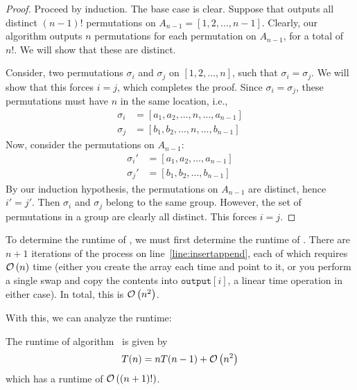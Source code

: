 \documentclass[final]{article}
\begin{document}
\begin{proof}
    Proceed by induction. The base case is clear. Suppose that  outputs all distinct $(n - 1)!$ permutations on $A_{n-1} = [1, 2, \dots, n - 1]$. Clearly, our algorithm outputs $n$ permutations for each permutation on $A_{n-1}$, for a total of $n!$. We will show that these are distinct.

    Consider, two permutations $\sigma_i$ and $\sigma_j$ on $[1, 2, \dots, n]$, such that $\sigma_i = \sigma_j$. We will show that this forces $i = j$, which completes the proof. Since $\sigma_i = \sigma_j$, these permutations must have $n$ in the same location, i.e.,
    \begin{align*}
        \sigma_i & = [a_1, a_2, \dots, n, \dots, a_{n-1}] \\
        \sigma_j & = [b_1, b_2, \dots, n, \dots, b_{n-1}]
    \end{align*}
    Now, consider the permutations on $A_{n-1}$:
    \begin{align*}
        \sigma_i' & = [a_1, a_2, \dots, a_{n-1}] \\
        \sigma_j' & = [b_1, b_2, \dots, b_{n-1}]
    \end{align*}
    By our induction hypothesis, the permutations on $A_{n-1}$ are distinct, hence $i' = j'$. Then $\sigma_i$ and $\sigma_j$ belong to the same group. However, the set of permutations in a group are clearly all distinct. This forces $i = j$.
\end{proof}

To determine the runtime of , we must first determine the runtime of . There are $n + 1$ iterations of the process on line~\ref{line:insertappend}, each of which requires $\mathcal{O}\left(n\right)$ time (either you create the array each time and point to it, or you perform a single swap and copy the contents into $\texttt{output}[i]$, a linear time operation in either case). In total, this is $\mathcal{O}\left(n^2\right)$.

With this, we can analyze the runtime:

\begin{theorem}{}{}
    The runtime of algorithm~ is given by \[T(n) = nT(n-1) + \mathcal{O}\left(n^2\right)\] which has a runtime of $\mathcal{O}\left((n+1)!\right)$.
\end{theorem}
\end{document}
